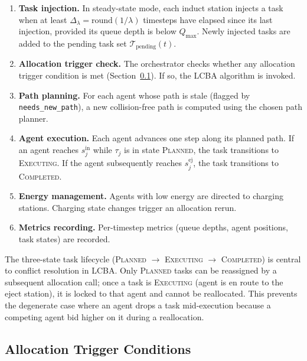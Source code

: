 \begin{enumerate}
  \item \textbf{Task injection.}
        In steady-state mode, each induct station injects a task when at least
        $\Delta_{\lambda} = \text{round}(1/\lambda)$ timesteps have elapsed
        since its last injection, provided its queue depth is below $Q_{\max}$.
        Newly injected tasks are added to the pending task set
        $\mathcal{T}_{\text{pending}}(t)$.
  \item \textbf{Allocation trigger check.}
        The orchestrator checks whether any allocation trigger condition is
        met (Section~\ref{sec:method_triggers}).
        If so, the LCBA algorithm is invoked.
  \item \textbf{Path planning.}
        For each agent whose path is stale (flagged by
        \texttt{needs\_new\_path}), a new collision-free path is computed
        using the chosen path planner.
  \item \textbf{Agent execution.}
        Each agent advances one step along its planned path.
        If an agent reaches $s_j^{\text{in}}$ while $\tau_j$ is in
        state \textsc{Planned}, the task transitions to
        \textsc{Executing}.
        If the agent subsequently reaches $s_j^{\text{ej}}$, the task
        transitions to \textsc{Completed}.
  \item \textbf{Energy management.}
        Agents with low energy are directed to charging stations.
        Charging state changes trigger an allocation rerun.
  \item \textbf{Metrics recording.}
        Per-timestep metrics (queue depths, agent positions, task states)
        are recorded.
\end{enumerate}

The three-state task lifecycle (\textsc{Planned} $\to$ \textsc{Executing}
$\to$ \textsc{Completed}) is central to conflict resolution in LCBA.
Only \textsc{Planned} tasks can be reassigned by a subsequent allocation call;
once a task is \textsc{Executing} (agent is en route to the eject station),
it is locked to that agent and cannot be reallocated.
This prevents the degenerate case where an agent drops a task mid-execution
because a competing agent bid higher on it during a reallocation.


\subsection{Allocation Trigger Conditions}
\label{sec:method_triggers}

